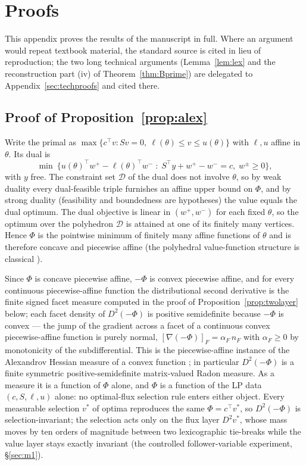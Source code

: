 \documentclass[11pt,a4paper]{article}
\theoremstyle{plain}
\theoremstyle{definition}
\theoremstyle{remark}
\begin{document}
\section{Proofs}\label{sec:proofs}

This appendix proves the results of the manuscript in full. Where an
argument would repeat textbook material, the standard source is cited
in lieu of reproduction; the two long technical arguments
(Lemma~\ref{lem:lex} and the reconstruction part (iv) of
Theorem~\ref{thm:Bprime}) are delegated to
Appendix~\ref{sec:techproofs} and cited there.

\subsection{Proof of Proposition~\ref{prop:alex}}

Write the primal as $\max\{c^\top v : Sv = 0,\ \ell(\theta) \le v
\le u(\theta)\}$ with $\ell, u$ affine in $\theta$. Its dual is
\[
\min\ \bigl\{u(\theta)^\top w^{+} - \ell(\theta)^\top w^{-}
\;:\; S^\top y + w^{+} - w^{-} = c,\; w^{\pm} \ge 0\bigr\},
\]
with $y$ free. The constraint set $\mathcal{D}$ of the dual does not
involve $\theta$, so by weak duality every dual-feasible triple
furnishes an affine upper bound on $\Phi$, and by strong duality
(feasibility and boundedness are hypotheses) the value equals the
dual optimum. The dual objective is linear in $(w^{+}, w^{-})$ for
each fixed $\theta$, so the optimum over the polyhedron
$\mathcal{D}$ is attained at one of its finitely many vertices.
Hence $\Phi$ is the pointwise minimum of finitely many affine
functions of $\theta$ and is therefore concave and piecewise affine
(the polyhedral value-function structure is classical
\citep{rockafellar1970, borrelli2003}).

Since $\Phi$ is concave piecewise affine, $-\Phi$ is convex piecewise
affine, and for every continuous piecewise-affine function the
distributional second derivative is the finite signed facet measure
computed in the proof of Proposition~\ref{prop:twolayer} below; each
facet density of $D^{2}(-\Phi)$ is positive semidefinite because
$-\Phi$ is convex --- the jump of the gradient across a facet of a
continuous convex piecewise-affine function is purely normal,
$[\nabla(-\Phi)]_{F} = \alpha_F\, n_F$ with $\alpha_F \ge 0$ by
monotonicity of the subdifferential. This is the piecewise-affine
instance of the Alexandrov Hessian measure of a convex function
\citep{alexandrov1939}; in particular $D^{2}(-\Phi)$ is a finite
symmetric positive-semidefinite matrix-valued Radon measure. As a
measure it is a function of $\Phi$ alone, and $\Phi$ is a function
of the LP data $(c, S, \ell, u)$ alone: no optimal-flux selection
rule enters either object. Every measurable selection $v^{*}$ of
optima reproduces the same $\Phi = c^{\top}v^{*}$, so
$D^{2}(-\Phi)$ is selection-invariant; the selection acts only on
the flux layer $D^{2}v^{*}$, whose mass moves by ten orders of
magnitude between two lexicographic tie-breaks while the value
layer stays exactly invariant (the controlled follower-variable
experiment, \S\ref{sec:m1}).
\end{document}
